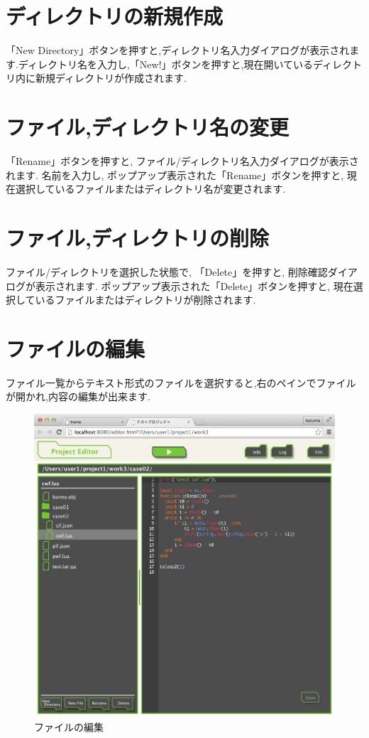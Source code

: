 \documentclass[a4paper,10pt,oneside]{jsbook}
\begin{document}
\section{ディレクトリの新規作成}
「New Directory」ボタンを押すと,ディレクトリ名入力ダイアログが表示されます.ディレクトリ名を入力し,「New!」ボタンを押すと,現在開いているディレクトリ内に新規ディレクトリが作成されます.

\section{ファイル,ディレクトリ名の変更}
「Rename」ボタンを押すと, ファイル/ディレクトリ名入力ダイアログが表示されます. 名前を入力し, ポップアップ表示された「Rename」ボタンを押すと, 現在選択しているファイルまたはディレクトリ名が変更されます.

\section{ファイル,ディレクトリの削除}
ファイル/ディレクトリを選択した状態で, 「Delete」を押すと, 削除確認ダイアログが表示されます. ポップアップ表示された「Delete」ボタンを押すと, 現在選択しているファイルまたはディレクトリが削除されます.

\newpage

\section{ファイルの編集}
ファイル一覧からテキスト形式のファイルを選択すると,右のペインでファイルが開かれ,内容の編集が出来ます.

\begin{figure}[htbp]
	\begin{center}
		\includegraphics[width=12.0cm]{image/projeditor_003.png}
	\end{center}
	\caption{ファイルの編集}
	\label{fig:projeditor_edit}
\end{figure}
\end{document}
